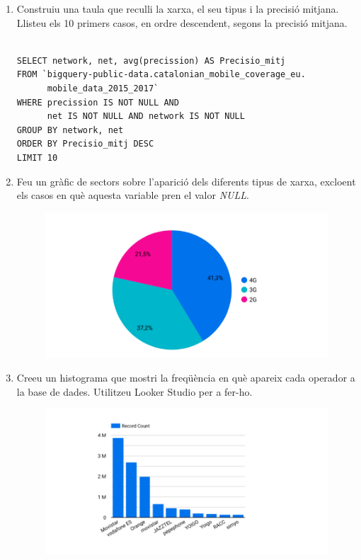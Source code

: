 \documentclass[12pt,longbibliography]{article}
\theoremstyle{definition}
\theoremstyle{remark}
\begin{document}
\begin{enumerate}
\begin{Verbatim}[frame=single]
\end{Verbatim}

\item Construiu una taula que reculli la xarxa, el seu tipus i la precisió mitjana. Llisteu els 10 primers casos, en ordre descendent, segons la precisió mitjana.

\begin{Verbatim}[frame=single]

SELECT network, net, avg(precission) AS Precisio_mitj
FROM `bigquery-public-data.catalonian_mobile_coverage_eu.
      mobile_data_2015_2017`
WHERE precission IS NOT NULL AND 
      net IS NOT NULL AND network IS NOT NULL
GROUP BY network, net
ORDER BY Precisio_mitj DESC
LIMIT 10

\end{Verbatim}

\item Feu un gràfic de sectors sobre l'aparició dels diferents tipus de xarxa, excloent els casos en què aquesta variable pren el valor \textit{NULL}.

\vspace{2mm}
\begin{figure}[H]
\begin{center}
\includegraphics[width=12.5cm]{pbq1}
\end{center}
\label{fig:pbq1}
\end{figure}

\item Creeu un histograma que mostri la freqüència en què apareix cada operador a la base de dades. Utilitzeu Looker Studio per a fer-ho.

\vspace{2mm}
\begin{figure}[H]
\begin{center}
\includegraphics[width=12.5cm]{pbq2}
\end{center}
\label{fig:pbq2}
\end{figure}


\end{enumerate}
\end{document}

